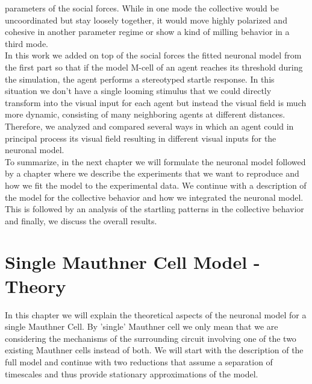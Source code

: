 \documentclass[a4paper,10pt,hidelinks]{scrreprt}
\begin{document}
	parameters of the social forces.
	While in one mode the collective would be uncoordinated but stay loosely together, it would 
	move highly polarized and cohesive in another parameter regime or show a kind of milling 
	behavior in a third mode.\\
    In this work we added on top of the social forces the fitted neuronal model from the first part so that if the model M-cell of an agent reaches its threshold during the simulation, the agent performs a stereotyped startle response.
    In this situation we don't have a single looming stimulus that we could directly transform into the visual input for each agent but instead the visual field is much more dynamic, consisting of many neighboring agents at different distances.
    Therefore, we analyzed and compared several ways in which an agent could in principal process its visual field resulting in different visual inputs for the neuronal model.\\
    To summarize, in the next chapter we will formulate the neuronal model followed by a chapter where we describe the experiments that we want to reproduce and how we fit the model to the experimental data.
    We continue with a description of the model for the collective behavior and how we integrated the neuronal model.
    This is followed by an analysis of the startling patterns in the collective behavior and finally, we discuss the overall results.
    
	\chapter{Single Mauthner Cell Model - Theory}
	In this chapter we will explain the theoretical aspects of the neuronal model for a single 
	Mauthner Cell.
	By 'single' Mauthner cell we only mean that we are considering the mechanisms of the 
	surrounding circuit involving one of the two existing Mauthner cells instead of both.
	We will start with the description of the full model and continue with two reductions that 
	assume a separation of timescales and thus provide stationary approximations of the model.
\end{document}
